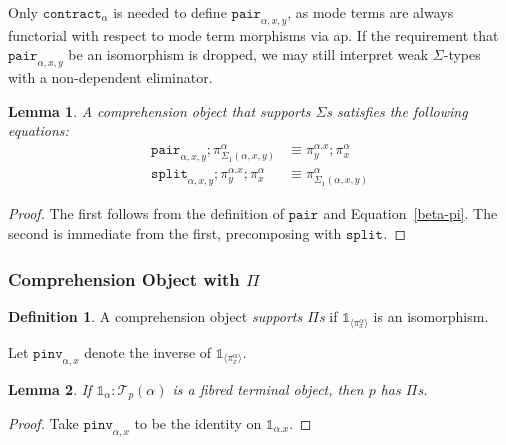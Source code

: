 \documentclass[10pt]{article}
\newtheorem{lemma}{Lemma}
\theoremstyle{definition}
\newtheorem{definition}{Definition}
\newcommand{\id}{\mathsf{id}}
\newcommand\El[2]{\mathcal{T}_{#1}(#2)}
\newcommand\bdot[0]{\mathbin{.}}
\newcommand\ApPlus[2]{\ensuremath{{#1}^+ \langle #2 \rangle }}
\newcommand{\tdot}{\ensuremath{\mathtt{dot}}}
\newcommand\One{\ensuremath{\mathds{1}}}
\newcommand\ApOne[1]{\ensuremath{\One_{\langle {#1} \rangle }}}
\newcommand\contract[1]{\ensuremath{\mathtt{contract}_{#1}}}
\newcommand\fibpair[1]{\ensuremath{\mathtt{fibpair}_{#1}}}
\newcommand\pair[1]{\ensuremath{\mathtt{pair}_{#1}}}
\newcommand\tsplit[1]{\ensuremath{\mathtt{split}_{#1}}}
\newcommand\pinv[1]{\ensuremath{\mathtt{pinv}_{#1}}}
\begin{document}

Only $\contract{\alpha}$ is needed to define $\pair{\alpha,x,y}$, as mode terms are always functorial with respect to mode term morphisms via ap. If the requirement that $\pair{\alpha, x, y}$ be an isomorphism is dropped, we may still interpret weak $\Sigma$-types with a non-dependent eliminator.

\begin{lemma}
A comprehension object that supports $\Sigma$s satisfies the following equations:
\begin{align}
\pair{\alpha,x,y};\pi^\alpha_{\Sigma_1(\alpha, x, y)} &\equiv \pi^{\alpha.x}_y;\pi^\alpha_x \\
\tsplit{\alpha,x,y};\pi^{\alpha.x}_y;\pi^\alpha_x &\equiv \pi^\alpha_{\Sigma_1(\alpha, x, y)} %
\end{align}
\end{lemma}
\begin{proof}
The first follows from the definition of $\pair{}$ and Equation~\ref{beta-pi}. The second is immediate from the first, precomposing with $\tsplit{}$. 
\end{proof}

\subsubsection{Comprehension Object with $\Pi$}

\begin{definition}\label{def:supports-pis}
A comprehension object \emph{supports $\Pi$s} if $\ApOne{\pi^\alpha_x}$ is an isomorphism.
\end{definition}

Let $\pinv{\alpha,x}$ denote the inverse of $\ApOne{\pi^\alpha_x}$.

\begin{lemma}
If $\One_\alpha : \El{p}{\alpha}$ is a fibred terminal object, then $p$ has $\Pi$s.
\end{lemma}
\begin{proof}
Take $\pinv{\alpha,x}$ to be the identity on $\One_{\alpha.x}$.
\end{proof}
\end{document}
